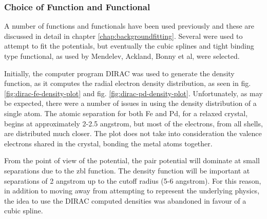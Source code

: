 \subsubsection{Choice of Function and Functional}

A number of functions and functionals have been used previously and these are discussed in detail in chapter \ref{chap:backgroundfitting}.  Several were used to attempt to fit the potentials, but eventually the cubic splines and tight binding type functional, as used by Mendelev, Ackland, Bonny et al, were selected.

Initially, the computer program DIRAC was used to generate the density function, as it computes the radial electron density distribution, as seen in fig. \ref{fig:dirac-fe-density-plot} and fig. \ref{fig:dirac-pd-density-plot}.  Unfortunately, as may be expected, there were a number of issues in using the density distribution of a single atom.  The atomic separation for both \Gls{Fe} and \Gls{Pd}, for a relaxed crystal, begins at approximately 2-2.5 angstrom, but most of the electrons, from all shells, are distributed much closer.  The plot does not take into consideration the valence electrons shared in the crystal, bonding the metal atoms together.

From the point of view of the potential, the pair potential will dominate at small separations due to the \acrshort{zbl} function.  The density function will be important at separations of 2 angstrom up to the cutoff radius (5-6 angstrom).  For this reason, in addition to moving away from attempting to represent the underlying physics, the idea to use the DIRAC computed densities was abandoned in favour of a cubic spline.

